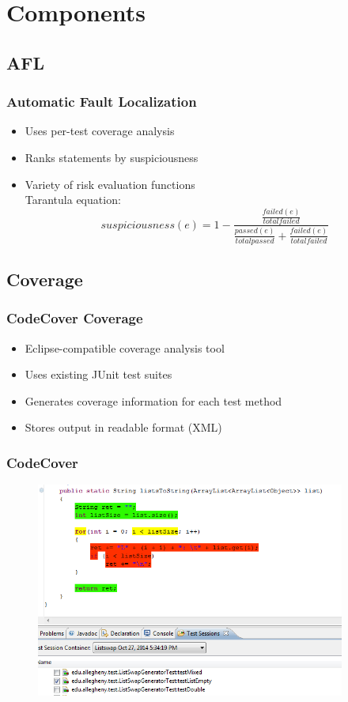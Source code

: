 \documentclass{beamer}
\begin{document}
	\section{Components}
	\subsection{AFL}
	\begin{frame}
	\frametitle{Automatic Fault Localization}
	\begin{itemize}
	  \item Uses per-test coverage analysis
	    \pause
	  \item Ranks statements by suspiciousness
	    \pause
	  \item Variety of risk evaluation functions\\
	  	Tarantula equation:
	  \begin{equation}
	suspiciousness(e) = 1 - \frac{\frac{failed(e)}{total failed}}{\frac{passed(e)}{total passed} + \frac{failed(e)}{total failed}}
	  \end{equation}
	\end{itemize}
	\end{frame}
	\subsection{Coverage}
	\begin{frame}
	\frametitle{CodeCover Coverage}
	\begin{itemize}
    	\item Eclipse-compatible coverage analysis tool
    	\pause
    	\item Uses existing JUnit test suites
    	\pause
    	\item Generates coverage information for each test method
    	\pause
    	\item Stores output in readable format (XML)
	\end{itemize}
	\end{frame}
	\begin{frame}
	\frametitle{CodeCover}
	  	\begin{figure}
	  		\label{coverage}
	  		\includegraphics[width=4in]{img/codecovercoverage}
	  	\end{figure}
	\end{frame}
\end{document}

